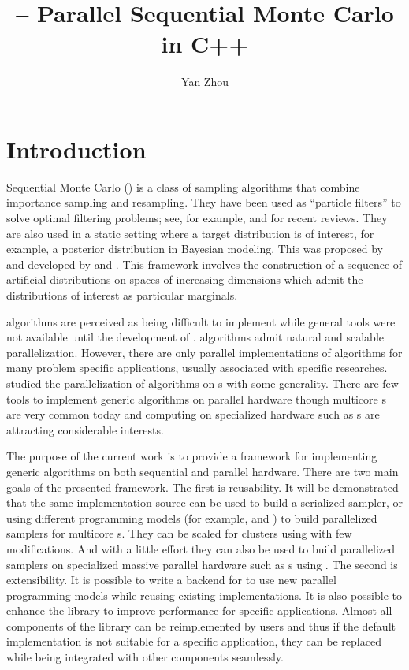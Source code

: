 \documentclass[11pt, fontset=Minion, showoverfull,
bib, mintcode, minted=cache]{marticle}
\title{\protect\vsmc{} -- Parallel Sequential Monte Carlo in C++}
\author{Yan Zhou}
\begin{document}
\maketitle

\section{Introduction}
\label{sec:Introduction}

Sequential Monte Carlo (\smc) is a class of sampling algorithms that combine
importance sampling and resampling. They have been used as ``particle
filters'' to solve optimal filtering problems; see, for example,
\textcite{Cappe:2007hz} and \textcite{Doucet:2011us} for recent reviews. They
are also used in a static setting where a target distribution is of interest,
for example, a posterior distribution in Bayesian modeling. This was proposed
by \textcite{DelMoral:2006hc} and developed by \textcite{Peters:2005wh} and
\textcite{DelMoral:2006wv}. This framework involves the construction of a
sequence of artificial distributions on spaces of increasing dimensions which
admit the distributions of interest as particular marginals.

\smc algorithms are perceived as being difficult to implement while general
tools were not available until the development of \smctc \parencite{smctc}.
\smc algorithms admit natural and scalable parallelization. However, there are
only parallel implementations of \smc algorithms for many problem specific
applications, usually associated with specific researches.
\textcite{Lee:2010fm} studied the parallelization of \smc algorithms on
\gpu{}s with some generality. There are few tools to implement generic \smc
algorithms on parallel hardware though multicore \cpu{}s are very common today
and computing on specialized hardware such as \gpu{}s are attracting
considerable interests.

The purpose of the current work is to provide a framework for implementing
generic \smc algorithms on both sequential and parallel hardware. There are
two main goals of the presented framework. The first is reusability. It will
be demonstrated that the same implementation source can be used to build a
serialized sampler, or using different programming models (for example,
\copenmp and \ctbb) to build parallelized samplers for multicore \cpu{}s. They
can be scaled for clusters using \cmpi with few modifications. And with a
little effort they can also be used to build parallelized samplers on
specialized massive parallel hardware such as \gpu{}s using \copencl. The
second is extensibility. It is possible to write a backend for \vsmc to use
new parallel programming models while reusing existing implementations. It is
also possible to enhance the library to improve performance for specific
applications. Almost all components of the library can be reimplemented by
users and thus if the default implementation is not suitable for a specific
application, they can be replaced while being integrated with other components
seamlessly.
\end{document}
